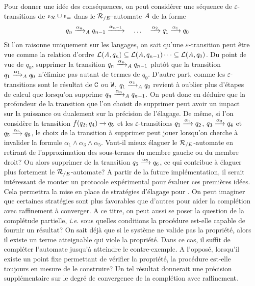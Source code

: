 Pour donner une idée des conséquences, on peut considérer une séquence de $\varepsilon$-transitions
de $\upvarepsilon_{\mathcal R} \cup \upvarepsilon_{=}$ dans le ${\mathcal R_{/E}}$-automate $\mathit A$ de la forme
\[q_n \xrightarrow{\alpha_n}_\mathit A q_{n-1} \xrightarrow{\alpha_{n-1}} \quad \dots \quad \xrightarrow{\alpha_2} q_1 \xrightarrow{\alpha_1} q_0\]
Si l'on raisonne uniquement sur les langages, on sait qu'une $\varepsilon$-transition peut être vue comme
la relation d'ordre $\mathcal{L}(\mathit A,q_n) \subseteq \mathcal{L}(\mathit A,q_{n-1}) \dots \subseteq \mathcal{L}(\mathit A,q_0)$.
Du point de vue de $q_0$, supprimer la transition $q_n \xrightarrow{\alpha_n}_\mathit A q_{n-1}$ plutôt que la transition
$q_1 \xrightarrow{\alpha_1}_\mathit A q_0$ n'élimine pas autant de termes de $q_0$. D'autre part, comme les $\varepsilon$-transitions 
sont le résultat de $\mathtt{C}$ ou $\mathtt{W}$, $q_1 \xrightarrow{\alpha_1}_\mathit A q_{0}$ revient à oublier plus d'étapes de calcul
que lorsqu'on supprime $q_n \xrightarrow{\alpha_n}_\mathit A q_{n-1}$. On peut donc en déduire que la profondeur de la transition
que l'on choisit de supprimer peut avoir un impact sur la puissance ou dualement sur la précision de l'élagage.
De même, si l'on considère la transition $f(q_2,q_4) \rightarrow q_5$ et les $\varepsilon$-transitions $q_1 \xrightarrow{\alpha_1} q_2$,
$q_3 \xrightarrow{\alpha_3} q_4$ et $q_5 \xrightarrow{\alpha_5} q_6$, le choix de la transition à supprimer peut jouer lorsqu'on
cherche à invalider la formule $\alpha_1 \land \alpha_3 \land \alpha_5$. Vaut-il mieux élaguer le ${\mathcal R_{/E}}$-automate 
en retirant de l'approximation des sous-termes du membre gauche ou du membre droit? Ou alors supprimer de la transition
$q_5 \xrightarrow{\alpha_5} q_6$, ce qui contribue à élaguer plus fortement le ${\mathcal R_{/E}}$-automate?
A partir de la future implémentation, il serait intéressant de monter un protocole expérimental pour évaluer 
ces premières idées. Cela permettra la mise en place de stratégies d'élagage pour \timbuk.
On peut imaginer que certaines stratégies sont plus favorables que d'autres pour aider la complétion
avec raffinement à converger.
A ce titre, on peut aussi se poser la question de la complétude partielle, \textit{i.e.} sous quelles conditions la procédure
est-elle capable de fournir un résultat? On sait déjà que si le système ne valide pas la propriété, alors il existe un terme atteignable
qui viole la propriété. Dans ce cas, il suffit de compléter l'automate jusqu'à atteindre le contre-exemple.
A l'opposé, lorsqu'il existe un point fixe permettant de vérifier la propriété, la procédure est-elle toujours en mesure
de le construire? Un tel résultat donnerait une précision supplémentaire sur le degré de convergence de la complétion avec raffinement.








